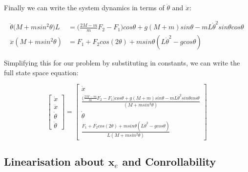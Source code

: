 \documentclass[12pt]{report}
\begin{document}
Finally we can write the system dynamics in terms of $\ddot{\theta}$ and $\ddot{x}$:

\begin{align}
\ddot{\theta}\big(M+msin^2\theta \big)L & = \bigg(\frac{2M-m}{m}F_2-F_1\bigg)cos\theta + g(M+m)sin\theta - mL\dot{\theta}^2 sin\theta cos\theta\\
\ddot{x}(M+msin^2\theta) & = F_1 + F_2cos(2\theta)+ msin\theta(L\dot{\theta}^2-gcos\theta)
\end{align}


Simplifying this for our problem by substituting in constants, we can write the full state space equation:

\begin{equation}
\begin{bmatrix} \dot{x} \\ \ddot{x} \\ \dot{\theta} \\ \ddot{\theta} \end{bmatrix}  =
\begin{bmatrix} \dot{x} \\ \frac{\big(\frac{2M-m}{m}F_2-F_1\big)cos\theta + g(M+m)sin\theta - mL\dot{\theta}^2 sin\theta cos\theta}{(M + msin^2\theta)} \\ \dot{\theta} \\ \frac{F_1 + F_2cos(2\theta)+ msin\theta(L\dot{\theta}^2-gcos\theta)}{L(M+msin^2\theta)} \end{bmatrix} 
\end{equation}

\subsection{Linearisation about $\boldsymbol{x}_e$ and Conrollability}
\end{document}
